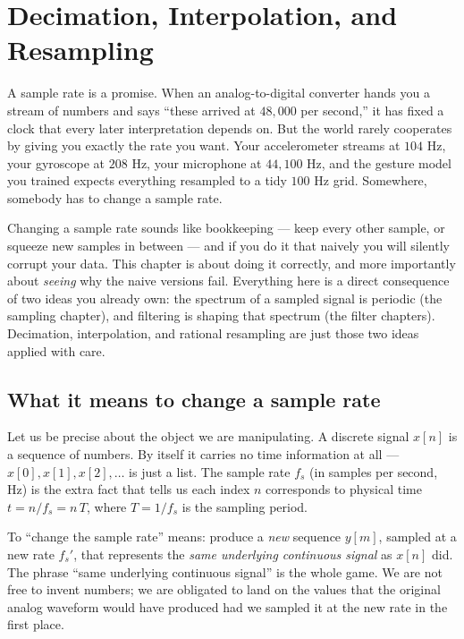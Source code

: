 \chapter{Decimation, Interpolation, and Resampling}

A sample rate is a promise. When an analog-to-digital converter hands you a
stream of numbers and says ``these arrived at $48{,}000$ per second,'' it has
fixed a clock that every later interpretation depends on. But the world rarely
cooperates by giving you exactly the rate you want. Your accelerometer streams
at $104$ Hz, your gyroscope at $208$ Hz, your microphone at $44{,}100$ Hz, and
the gesture model you trained expects everything resampled to a tidy $100$ Hz
grid. Somewhere, somebody has to change a sample rate.

Changing a sample rate sounds like bookkeeping --- keep every other sample, or
squeeze new samples in between --- and if you do it that naively you will
silently corrupt your data. This chapter is about doing it correctly, and more
importantly about \emph{seeing} why the naive versions fail. Everything here is
a direct consequence of two ideas you already own: the spectrum of a sampled
signal is periodic (the sampling chapter), and filtering is shaping that
spectrum (the filter chapters). Decimation, interpolation, and rational
resampling are just those two ideas applied with care.

\section{What it means to change a sample rate}
\label{ch22:meaning}

Let us be precise about the object we are manipulating. A discrete signal
$x[n]$ is a sequence of numbers. By itself it carries no time information at
all --- $x[0], x[1], x[2], \dots$ is just a list. The sample rate $f_s$ (in
samples per second, Hz) is the extra fact that tells us each index $n$
corresponds to physical time $t = n/f_s = n\,T$, where $T = 1/f_s$ is the
sampling period.

To ``change the sample rate'' means: produce a \emph{new} sequence $y[m]$,
sampled at a new rate $f_s'$, that represents the \emph{same underlying
continuous signal} as $x[n]$ did. The phrase ``same underlying continuous
signal'' is the whole game. We are not free to invent numbers; we are obligated
to land on the values that the original analog waveform would have produced had
we sampled it at the new rate in the first place.

